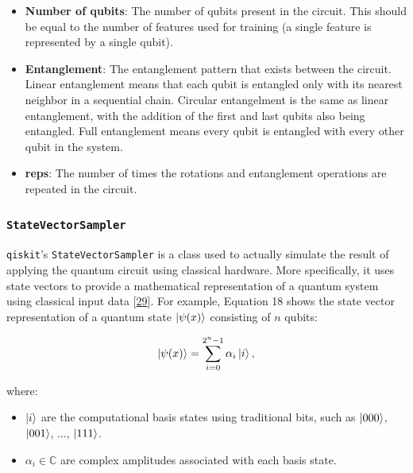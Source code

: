 \documentclass[11pt, oneside]{article}   	%
\begin{document}
\begin{itemize}

	\item \textbf{Number of qubits}: The number of qubits present in the circuit. This should be equal to the number of features used for training (a single feature is represented by a single qubit).
	\item \textbf{Entanglement}: The entanglement pattern that exists between the circuit. Linear entanglement means that each qubit is entangled only with its nearest neighbor in a sequential chain. Circular entangelment is the same as linear entanglement, with the addition of the first and last qubits also being entangled. Full entanglement means every qubit is entangled with every other qubit in the system.
	\item \textbf{reps}: The number of times the rotations and entanglement operations are repeated in the circuit.

\end{itemize}



\subsubsection{\texttt{StateVectorSampler}}

\texttt{qiskit}'s \texttt{StateVectorSampler} is a class used to actually simulate the result of applying the quantum circuit using classical hardware. More specifically, it uses state vectors to provide a mathematical representation of a quantum system using classical input data  [\href{https://doi.org/10.48550/arXiv.2405.08810}{29}]. For example, Equation 18 shows the state vector representation of a quantum state $\ket{\psi(x)}$ consisting of $n$ qubits:

\begin{equation}
\ket{\psi(x)} = \sum_{i=0}^{2^n - 1} \alpha_i \ket{i},
\end{equation}

\noindent where:

\begin{itemize}
    \item $\ket{i}$ are the computational basis states using traditional bits, such as $\ket{000}$, $\ket{001}$, $\dots$, $\ket{111}$.
    \item $\alpha_i \in \mathbb{C}$ are complex amplitudes associated with each basis state.
\end{itemize}
\end{document}

